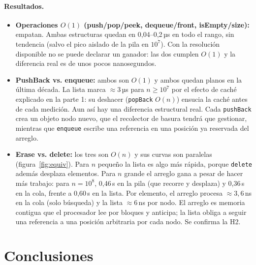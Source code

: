 \documentclass[11pt,a4paper]{article}
\newcommand{\us}{\,µs}
\newcommand{\Oone}{$O(1)$}
\newcommand{\On}{$O(n)$}
\begin{document}
\paragraph{Resultados.}
\begin{itemize}
\item \textbf{Operaciones \Oone{} (push/pop/peek, dequeue/front, isEmpty/size):} empatan. Ambas
  estructuras quedan en 0,04--0,2\us{} en todo el rango, sin tendencia (salvo el pico aislado de la
  pila en $10^7$). Con la resolución disponible no
  se puede declarar un ganador: las dos cumplen \Oone{} y la diferencia real es de unos pocos
  nanosegundos.
\item \textbf{PushBack vs. enqueue:} ambos son \Oone{} y ambos quedan planos en la última década. La
  lista marca $\approx3$\us{} para $n \ge 10^7$ por el efecto de caché explicado en la parte 1: su
  deshacer (\texttt{popBack} \On) ensucia la caché antes de cada medición. Aun así hay una diferencia
  estructural real. Cada \texttt{pushBack} crea un objeto nodo nuevo, que el recolector de basura
  tendrá que gestionar, mientras que \texttt{enqueue} escribe una referencia en una posición ya
  reservada del arreglo.
\item \textbf{Erase vs. delete:} los tres son \On{} y sus curvas son paralelas (figura~\ref{fig:equiv}).
  Para $n$ pequeño la lista es algo más rápida, porque \texttt{delete} además desplaza elementos. Para
  $n$ grande el arreglo gana a pesar de hacer más trabajo: para $n=10^8$, 0,46\,s en la pila (que
  recorre y desplaza) y 0,36\,s en la cola, frente a 0,60\,s en la lista. Por elemento, el arreglo
  procesa $\approx3{,}6$\,ns en la cola (solo búsqueda) y la lista $\approx6$\,ns por nodo. El arreglo
  es memoria contigua que el procesador lee por bloques y anticipa; la lista obliga a seguir una
  referencia a una posición arbitraria por cada nodo. Se confirma la H2.
\end{itemize}

\section{Conclusiones}
\end{document}

